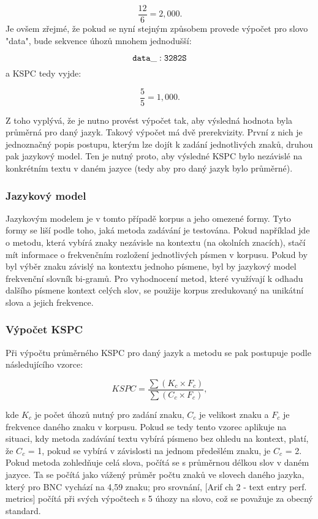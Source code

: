 \documentclass[a4paper,11pt]{article}
\begin{document}
\[
	\frac{12}{6} = 2,000.
\]
Je ovšem zřejmé, že pokud se nyní stejným způsobem provede výpočet pro slovo "data", bude sekvence úhozů mnohem jednodušší:

\[
	{\tt data\_: 3282S}
\]
a KSPC tedy vyjde:

\[
	\frac{5}{5} = 1,000.
\]

Z toho vyplývá, že je nutno provést výpočet tak, aby výsledná hodnota byla průměrná pro daný jazyk. Takový výpočet má dvě prerekvizity. První z nich je jednoznačný popis postupu, kterým lze dojít k zadání jednotlivých znaků, druhou pak jazykový model. Ten je nutný proto, aby výsledné KSPC bylo nezávislé na konkrétním textu v daném jazyce (tedy aby pro daný jazyk bylo průměrné).

\subsubsection{Jazykový model}

Jazykovým modelem je v tomto případě korpus a jeho omezené formy. Tyto formy se liší podle toho, jaká metoda zadávání je testována. Pokud například jde o metodu, která vybírá znaky nezávisle na kontextu (na okolních znacích), stačí mít informace o frekvenčním rozložení jednotlivých písmen v korpusu. Pokud by byl výběr znaku závislý na kontextu jednoho písmene, byl by jazykový model frekvenční slovník bi-gramů. Pro vyhodnocení metod, které využívají k odhadu dalšího písmene kontext celých slov, se použije korpus zredukovaný na unikátní slova a jejich frekvence. %

\subsubsection{Výpočet KSPC}

Při výpočtu průměrného KSPC pro daný jazyk a metodu se pak postupuje podle následujícího vzorce:

\[
	KSPC = \frac{\sum{ (K_c \times F_c) }}{\sum{ (C_c \times F_c) }},
\]

kde $K_c$ je počet úhozů nutný pro zadání znaku, $C_c$ je velikost znaku a $F_c$ je frekvence daného znaku v korpusu. Pokud se tedy tento vzorec aplikuje na situaci, kdy metoda zadávání textu vybírá písmeno bez ohledu na kontext, platí, že $C_c$ = 1, pokud se vybírá v závislosti na jednom předešlém znaku, je $C_c$ = 2. Pokud metoda zohledňuje celá slova, počítá se s průměrnou délkou slov v daném jazyce. Ta se počítá jako vážený průměr počtu znaků ve slovech daného jazyka, který pro BNC vychází na 4,59 znaku; pro srovnání, [Arif ch 2 - text entry perf. metrics] počítá při svých výpočtech s 5 úhozy na slovo, což se považuje za obecný standard. %
\end{document}
